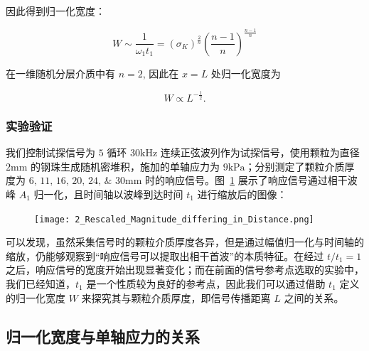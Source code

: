 因此得到归一化宽度：

\begin{equation}
W\sim \frac{1}{\omega_{1}t_{1}} = (\sigma_{K})^{\frac{2}{n}}\left(\frac{n-1}{n}\right)^{\frac{n-1}{n}}
\end{equation}

在一维随机分层介质中有 $n=2$, 因此在 $x = L$ 处归一化宽度为

\begin{equation}
  W\propto L^{-\frac{1}{2}}.
\end{equation}

\subsubsection{实验验证}

我们控制试探信号为 $5$ 循环 $30\unit{\kilo\Hz}$ 连续正弦波列作为试探信号，使用颗粒为直径 $2\unit{\milli\meter}$ 的钢珠生成随机密堆积，施加的单轴应力为 $9\unit{\kilo\Pa}$；分别测定了颗粒介质厚度为 $\numlist{6;11;16;20;24;30}\unit{\milli\metre}$ 时的响应信号。图~\ref{fig:reference_point} 展示了响应信号通过相干波峰 $A_{1}$ 归一化，且时间轴以波峰到达时间 $t_{1}$ 进行缩放后的图像：

\begin{figure}[!htp]
  \centering
  \texttt{[image: 2\_Rescaled\_Magnitude\_differing\_in\_Distance.png]}
  \label{fig:reference_point}
\end{figure}

可以发现，虽然采集信号时的颗粒介质厚度各异，但是通过幅值归一化与时间轴的缩放，仍能够观察到“响应信号可以提取出相干首波”的本质特征。在经过 $t/t_{1} = 1$ 之后，响应信号的宽度开始出现显著变化；而在前面的信号参考点选取的实验中，我们已经知道，$t_{1}$ 是一个性质较为良好的参考点，因此我们可以通过借助 $t_{1}$ 定义的归一化宽度 $W$ 来探究其与颗粒介质厚度，即信号传播距离 $L$ 之间的关系。

\subsection{归一化宽度与单轴应力的关系}


